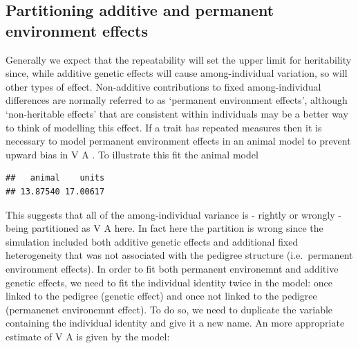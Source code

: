 \documentclass[
  12pt,
]{book}
\newenvironment{Shaded}{\begin{snugshade}}{\end{snugshade}}
\newcommand{\AttributeTok}[1]{\textcolor[rgb]{0.77,0.63,0.00}{#1}}
\newcommand{\ConstantTok}[1]{\textcolor[rgb]{0.00,0.00,0.00}{#1}}
\newcommand{\DecValTok}[1]{\textcolor[rgb]{0.00,0.00,0.81}{#1}}
\newcommand{\FloatTok}[1]{\textcolor[rgb]{0.00,0.00,0.81}{#1}}
\newcommand{\FunctionTok}[1]{\textcolor[rgb]{0.00,0.00,0.00}{#1}}
\newcommand{\NormalTok}[1]{#1}
\newcommand{\OtherTok}[1]{\textcolor[rgb]{0.56,0.35,0.01}{#1}}
\newcommand{\SpecialCharTok}[1]{\textcolor[rgb]{0.00,0.00,0.00}{#1}}
\begin{document}
\hypertarget{partitioning-additive-and-permanent-environment-effects-1}{%
\subsection{Partitioning additive and permanent environment effects}\label{partitioning-additive-and-permanent-environment-effects-1}}

Generally we expect that the repeatability will set the upper limit for heritability since, while additive genetic effects will cause among-individual variation, so will other types of effect. Non-additive contributions to fixed among-individual differences are normally referred to as `permanent environment effects', although `non-heritable effects' that are consistent within individuals may be a better way to think of modelling this effect. If a trait has repeated measures then it is necessary to model permanent environment effects in an animal model to prevent upward bias in V A . To illustrate this fit the animal model

\begin{Shaded}
\end{Shaded}

\begin{verbatim}
##   animal    units 
## 13.87540 17.00617
\end{verbatim}

This suggests that all of the among-individual variance is - rightly or wrongly - being partitioned as V A here. In fact here the partition is wrong since the simulation included both additive genetic effects and additional fixed heterogeneity that was not associated with the pedigree structure (i.e.~permanent environment effects).
In order to fit both permanent environemnt and additive genetic effects, we need to fit the individual identity twice in the model: once linked to the pedigree (genetic effect) and once not linked to the pedigree (permanenet environemnt effect).
To do so, we need to duplicate the variable containing the individual identity and give it a new name.
An more appropriate estimate of V A is given by the model:
\end{document}
